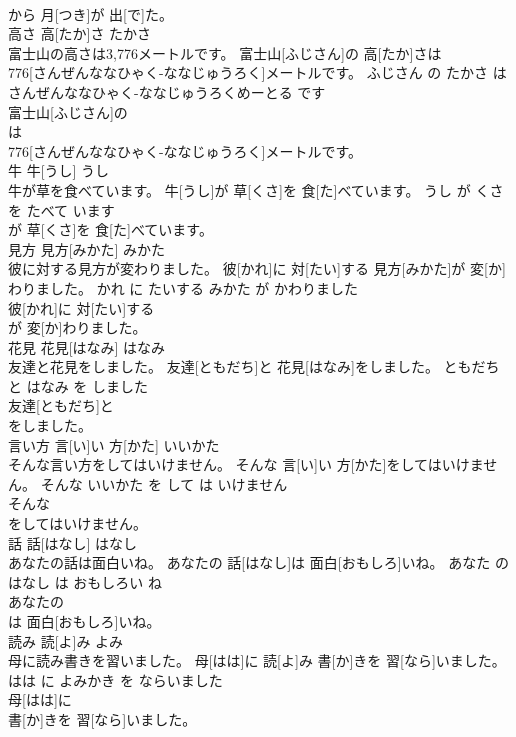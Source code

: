\documentclass[8pt]{extreport}
\begin{document}
\begin{CJK}{UTF8}{min}
\\	から 月[つき]が 出[で]た。			
\\	高さ	高[たか]さ	たかさ	
\\	富士山の高さは3,776メートルです。	富士山[ふじさん]の 高[たか]さは 
\\	776[さんぜんななひゃく-ななじゅうろく]メートルです。	ふじさん の たかさ は さんぜんななひゃく-ななじゅうろくめーとる です	
\\	富士山[ふじさん]の
\\	は 
\\	776[さんぜんななひゃく-ななじゅうろく]メートルです。			
\\	牛	牛[うし]	うし	
\\	牛が草を食べています。	牛[うし]が 草[くさ]を 食[た]べています。	うし が くさ を たべて います	
\\	が 草[くさ]を 食[た]べています。			
\\	見方	見方[みかた]	みかた	
\\	彼に対する見方が変わりました。	彼[かれ]に 対[たい]する 見方[みかた]が 変[か]わりました。	かれ に たいする みかた が かわりました	
\\	彼[かれ]に 対[たい]する
\\	が 変[か]わりました。			
\\	花見	花見[はなみ]	はなみ	
\\	友達と花見をしました。	友達[ともだち]と 花見[はなみ]をしました。	ともだち と はなみ を しました	
\\	友達[ともだち]と
\\	をしました。			
\\	言い方	言[い]い 方[かた]	いいかた	
\\	そんな言い方をしてはいけません。	そんな 言[い]い 方[かた]をしてはいけません。	そんな いいかた を して は いけません	
\\	そんな
\\	をしてはいけません。			
\\	話	話[はなし]	はなし	
\\	あなたの話は面白いね。	あなたの 話[はなし]は 面白[おもしろ]いね。	あなた の はなし は おもしろい ね	
\\	あなたの
\\	は 面白[おもしろ]いね。			
\\	読み	読[よ]み	よみ	
\\	母に読み書きを習いました。	母[はは]に 読[よ]み 書[か]きを 習[なら]いました。	はは に よみかき を ならいました	
\\	母[はは]に
\\	書[か]きを 習[なら]いました。			

\end{CJK}
\end{document}
